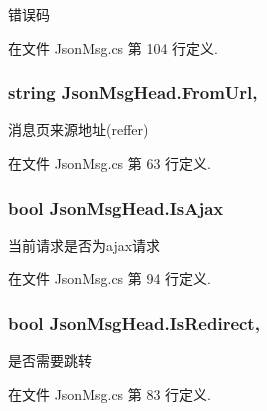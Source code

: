 错误码 



在文件 Json\-Msg.\-cs 第 104 行定义.

\hypertarget{class_json_msg_head_a54e392cc544783fd8f6eff683837efeb}{
\subsubsection[{From\-Url}]{\setlength{\rightskip}{0pt plus 5cm}string Json\-Msg\-Head.\-From\-Url\hspace{0.3cm}{\ttfamily [get]}, {\ttfamily [set]}}}\label{class_json_msg_head_a54e392cc544783fd8f6eff683837efeb}


消息页来源地址(reffer) 



在文件 Json\-Msg.\-cs 第 63 行定义.

\hypertarget{class_json_msg_head_abdfd31cd1c4bcbca50b1afc5e57c95d8}{
\subsubsection[{Is\-Ajax}]{\setlength{\rightskip}{0pt plus 5cm}bool Json\-Msg\-Head.\-Is\-Ajax\hspace{0.3cm}{\ttfamily [get]}}}\label{class_json_msg_head_abdfd31cd1c4bcbca50b1afc5e57c95d8}


当前请求是否为ajax请求 



在文件 Json\-Msg.\-cs 第 94 行定义.

\hypertarget{class_json_msg_head_a6be740681187896f1f1924cc07ca544e}{
\subsubsection[{Is\-Redirect}]{\setlength{\rightskip}{0pt plus 5cm}bool Json\-Msg\-Head.\-Is\-Redirect\hspace{0.3cm}{\ttfamily [get]}, {\ttfamily [set]}}}\label{class_json_msg_head_a6be740681187896f1f1924cc07ca544e}


是否需要跳转 



在文件 Json\-Msg.\-cs 第 83 行定义.

